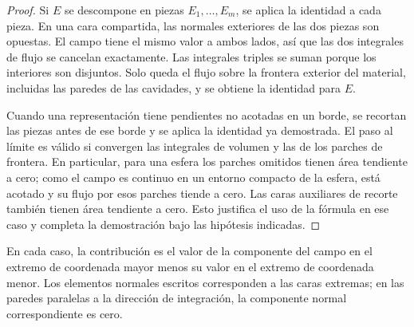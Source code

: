\begin{proof}
Si $E$ se descompone en piezas $E_1,\ldots,E_m$, se aplica la identidad a cada pieza. En una cara compartida, las normales exteriores de las dos piezas son opuestas. El campo tiene el mismo valor a ambos lados, así que las dos integrales de flujo se cancelan exactamente. Las integrales triples se suman porque los interiores son disjuntos. Solo queda el flujo sobre la frontera exterior del material, incluidas las paredes de las cavidades, y se obtiene la identidad para $E$.

Cuando una representación tiene pendientes no acotadas en un borde, se recortan las piezas antes de ese borde y se aplica la identidad ya demostrada. El paso al límite es válido si convergen las integrales de volumen y las de los parches de frontera. En particular, para una esfera los parches omitidos tienen área tendiente a cero; como el campo es continuo en un entorno compacto de la esfera, está acotado y su flujo por esos parches tiende a cero. Las caras auxiliares de recorte también tienen área tendiente a cero. Esto justifica el uso de la fórmula en ese caso y completa la demostración bajo las hipótesis indicadas.
\end{proof}

En cada caso, la contribución es el valor de la componente del campo en el extremo de coordenada mayor menos su valor en el extremo de coordenada menor. Los elementos normales escritos corresponden a las caras extremas; en las paredes paralelas a la dirección de integración, la componente normal correspondiente es cero.


\begingroup\shorthandoff{>}
\begin{center}
\end{center}
\endgroup

